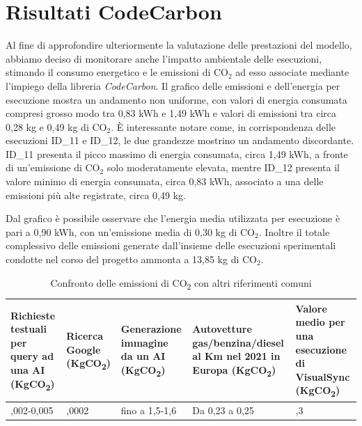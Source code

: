 \section{Risultati CodeCarbon}
\begin{flushleft}
Al fine di approfondire ulteriormente la valutazione delle prestazioni del modello, abbiamo deciso di monitorare anche l'impatto ambientale delle esecuzioni, stimando il consumo energetico e le emissioni di CO$_2$ ad esso associate mediante l'impiego della libreria \textit{CodeCarbon}.
Il grafico delle emissioni e dell'energia per esecuzione mostra un andamento non uniforme, con valori di energia consumata compresi grosso modo tra 0,83 kWh e 1,49 kWh e valori di emissioni tra circa 0,28 kg e 0,49 kg di CO$_2$. È interessante notare come, in corrispondenza delle esecuzioni ID\_11 e ID\_12, le due grandezze mostrino un andamento discordante. ID\_11 presenta il picco massimo di energia consumata, circa 1,49 kWh, a fronte di un'emissione di CO$_2$ solo moderatamente elevata, mentre ID\_12 presenta il valore minimo di energia consumata, circa 0,83 kWh, associato a una delle emissioni più alte registrate, circa 0,49 kg.


Dal grafico è possibile osservare che l'energia media utilizzata per esecuzione è pari a 0,90 kWh, con un'emissione media di 0,30 kg di CO$_2$. Inoltre il totale complessivo delle emissioni generate dall'insieme delle esecuzioni sperimentali condotte nel corso del progetto ammonta a 13,85 kg di CO$_2$.
\end{flushleft}

\begin{table}[htbp]
    \centering
    \label{tab:confronto_emissioni_co2}
    \footnotesize
    \renewcommand{\arraystretch}{1.3}
    \begin{tabular}{
        >{\centering\arraybackslash}p{2.2cm}
        >{\centering\arraybackslash}p{1.9cm}
        >{\centering\arraybackslash}p{2.2cm}
        >{\centering\arraybackslash}p{2.6cm}
        >{\centering\arraybackslash}p{2.0cm}
    }
        \toprule
        \textbf{Richieste testuali per query ad una AI (KgCO\textsubscript{2})} &
        \textbf{Ricerca Google (KgCO\textsubscript{2})} &
        \textbf{Generazione immagine da un AI (KgCO\textsubscript{2})} &
        \textbf{Autovetture gas/\allowbreak benzina/\allowbreak diesel al Km nel 2021 in Europa (KgCO\textsubscript{2})} &
        \textbf{Valore medio per una esecuzione di VisualSync (KgCO\textsubscript{2})} \\
        \midrule
        0,002-0,005 & 0,0002 & fino a 1,5-1,6 & Da 0,23 a 0,25 & 0,3 \\
        \bottomrule
    \end{tabular}
    \caption{Confronto delle emissioni di CO\textsubscript{2} con altri riferimenti comuni}
\end{table}

